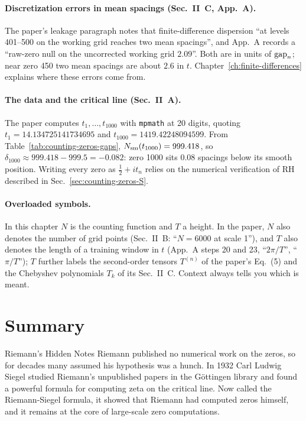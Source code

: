 \paragraph{Discretization errors in mean spacings (Sec.~II~C, App.~A).} The paper's leakage paragraph notes that finite-difference dispersion ``at levels 401--500 on the working grid reaches two mean spacings'', and App.~A records a ``raw-zero null on the uncorrected working grid $2.09$''. Both are in units of $\mathrm{gap}_n$; near zero 450 two mean spacings are about $2.6$ in $t$. Chapter~\ref{ch:finite-differences} explains where these errors come from.

\paragraph{The data and the critical line (Sec.~II~A).} The paper computes $t_1,\dots,t_{1000}$ with \texttt{mpmath} at 20 digits, quoting $t_1=14.134725141734695$ and $t_{1000}=1419.42248094599$. From Table~\ref{tab:counting-zeros-gaps}, $N_{\mathrm{sm}}(t_{1000})=999.418$, so $\delta_{1000}\approx999.418-999.5=-0.082$: zero 1000 sits $0.08$ spacings below its smooth position. Writing every zero as $\frac12+it_n$ relies on the numerical verification of RH described in Sec.~\ref{sec:counting-zeros-S}.

\paragraph{Overloaded symbols.} In this chapter $N$ is the counting function and $T$ a height. In the paper, $N$ also denotes the number of grid points (Sec.~II~B: ``$N=6000$ at scale 1''), and $T$ also denotes the length of a training window in $t$ (App.~A steps 20 and 23, ``$2\pi/T$'', ``$\pi/T$''); $T$ further labels the second-order tensors $T^{(n)}$ of the paper's Eq.~(5) and the Chebyshev polynomials $T_k$ of its Sec.~II~C. Context always tells you which is meant.

\section{Summary}\label{sec:counting-zeros-summary}
\begin{didyouknow}{Riemann's Hidden Notes}
Riemann published no numerical work on the zeros, so for decades many assumed his hypothesis was a hunch. In 1932 Carl Ludwig Siegel studied Riemann's unpublished papers in the G\"ottingen library and found a powerful formula for computing zeta on the critical line. Now called the Riemann-Siegel formula, it showed that Riemann had computed zeros himself, and it remains at the core of large-scale zero computations.
\end{didyouknow}


